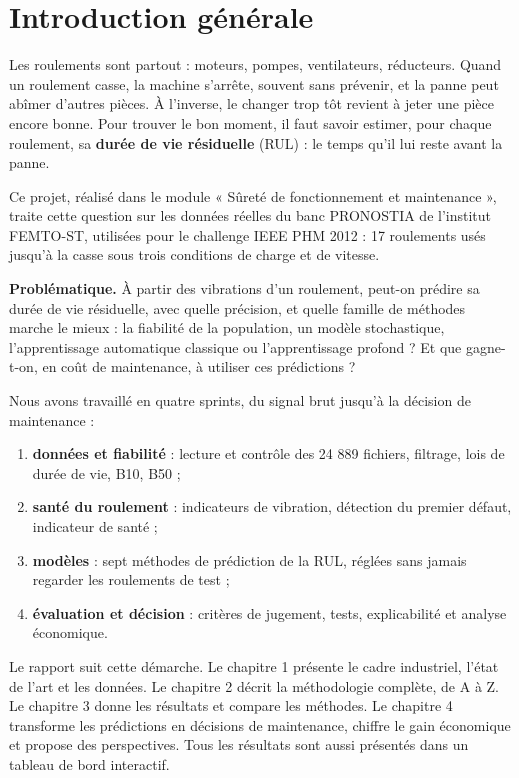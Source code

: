 \chapter*{Introduction générale}

Les roulements sont partout : moteurs, pompes, ventilateurs, réducteurs. Quand un roulement casse, la machine s'arrête, souvent sans prévenir, et la panne peut abîmer d'autres pièces. À l'inverse, le changer trop tôt revient à jeter une pièce encore bonne. Pour trouver le bon moment, il faut savoir estimer, pour chaque roulement, sa \textbf{durée de vie résiduelle} (RUL) : le temps qu'il lui reste avant la panne.

Ce projet, réalisé dans le module « Sûreté de fonctionnement et maintenance », traite cette question sur les données réelles du banc PRONOSTIA de l'institut FEMTO-ST, utilisées pour le challenge IEEE PHM 2012 \cite{nectoux2012,phm2012challenge} : 17 roulements usés jusqu'à la casse sous trois conditions de charge et de vitesse.

\begin{encadre}
\textbf{Problématique.} À partir des vibrations d'un roulement, peut-on prédire sa durée de vie résiduelle, avec quelle précision, et quelle famille de méthodes marche le mieux : la fiabilité de la population, un modèle stochastique, l'apprentissage automatique classique ou l'apprentissage profond ? Et que gagne-t-on, en coût de maintenance, à utiliser ces prédictions ?
\end{encadre}

Nous avons travaillé en quatre sprints, du signal brut jusqu'à la décision de maintenance :
\begin{enumerate}
  \item \textbf{données et fiabilité} : lecture et contrôle des 24 889 fichiers, filtrage, lois de durée de vie, B10, B50 ;
  \item \textbf{santé du roulement} : indicateurs de vibration, détection du premier défaut, indicateur de santé ;
  \item \textbf{modèles} : sept méthodes de prédiction de la RUL, réglées sans jamais regarder les roulements de test ;
  \item \textbf{évaluation et décision} : critères de jugement, tests, explicabilité et analyse économique.
\end{enumerate}

Le rapport suit cette démarche. Le chapitre 1 présente le cadre industriel, l'état de l'art et les données. Le chapitre 2 décrit la méthodologie complète, de A à Z. Le chapitre 3 donne les résultats et compare les méthodes. Le chapitre 4 transforme les prédictions en décisions de maintenance, chiffre le gain économique et propose des perspectives. Tous les résultats sont aussi présentés dans un tableau de bord interactif.
